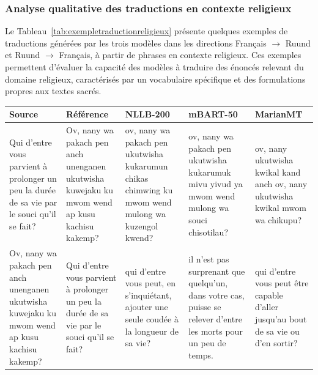 \subsubsection{Analyse qualitative des traductions en contexte religieux}
Le Tableau~\ref{tab:exempletraductionreligieux} présente quelques exemples de traductions générées par les trois modèles dans les directions Français $\rightarrow$ Ruund et Ruund $\rightarrow$ Français, à partir de phrases en contexte religieux. Ces exemples permettent d'évaluer la capacité des modèles à traduire des énoncés relevant du domaine religieux, caractérisés par un vocabulaire spécifique et des formulations propres aux textes sacrés.\begin{landscape}
\begingroup
\renewcommand{\arraystretch}{1.4}
\small
{}
\begin{longtable}{p{4.5cm}p{4.5cm}p{4.5cm}p{4.5cm}p{4.5cm}}
\toprule
\textbf{Source} & \textbf{Référence} & \textbf{\ac{NLLB}-200} & \textbf{\ac{mBART}-50} & \textbf{\ac{MarianMT}} \\
\midrule
\endfirsthead
\endhead

\bottomrule
\endfoot

\bottomrule
\endlastfoot
Qui d'entre vous parvient à prolonger un peu la durée de sa vie par le souci qu'il se fait? & Ov, nany wa pakach pen anch unenganen ukutwisha kuwejaku ku mwom wend ap kusu kachisu kakemp? &  ov, nany wa pakach pen ukutwisha kukarumun chikas chimwing ku mwom wend mulong wa kuzengol kwend? & ov, nany wa pakach pen ukutwisha kukarumuk mivu yivud ya mwom wend mulong wa souci chisotilau? &  ov, nany ukutwisha kwikal kand anch ov, nany ukutwisha kwikal mwom wa chikupu? \\
Ov, nany wa pakach pen anch unenganen ukutwisha kuwejaku ku mwom wend ap kusu kachisu kakemp? & Qui d'entre vous parvient à prolonger un peu la durée de sa vie par le souci qu'il se fait? & qui d'entre vous peut, en s'inquiétant, ajouter une seule coudée à la longueur de sa vie? & il n'est pas surprenant que quelqu'un, dans votre cas, puisse se relever d'entre les morts pour un peu de temps. & qui d'entre vous peut être capable d'aller jusqu'au bout de sa vie ou d'en sortir? \\
\bottomrule
\end{longtable}
\addtocounter{table}{-1}
{\captionsetup{hypcap=false}
\label{tab:exempletraductionreligieux}}
\endgroup
\end{landscape}


